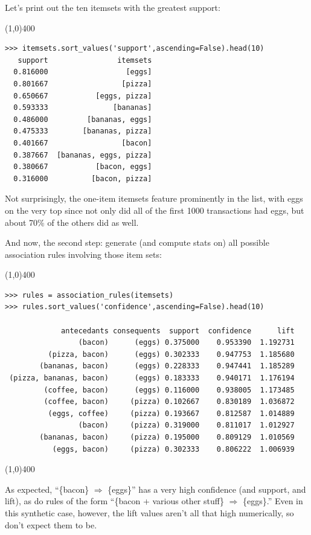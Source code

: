 \documentclass[12pt]{article}
\begin{document}
\vspace{.1in}
Let's print out the ten itemsets with the greatest support:
\footnotesize
\begin{center}
\line(1,0){400}
\end{center}
\begin{Verbatim}[fontsize=\small,samepage=true,frame=none]
>>> itemsets.sort_values('support',ascending=False).head(10)
   support                itemsets
  0.816000                  [eggs]
  0.801667                 [pizza]
  0.650667           [eggs, pizza]
  0.593333               [bananas]
  0.486000         [bananas, eggs]
  0.475333        [bananas, pizza]
  0.401667                 [bacon]
  0.387667  [bananas, eggs, pizza]
  0.380667           [bacon, eggs]
  0.316000          [bacon, pizza]
\end{Verbatim}
\normalsize
\vspace{.3in}
\pagebreak
Not surprisingly, the one-item itemsets feature prominently in the list, with
eggs on the very top since not only did all of the first 1000 transactions had
eggs, but about 70\% of the others did as well.

\vspace{.1in}
And now, the second step: generate (and compute stats on) all possible
association rules involving those item sets:
\begin{center}
\line(1,0){400}
\end{center}
\small
\begin{Verbatim}[fontsize=\small,samepage=true,frame=none]
>>> rules = association_rules(itemsets)
>>> rules.sort_values('confidence',ascending=False).head(10)

             antecedants consequents  support  confidence      lift 
                 (bacon)      (eggs) 0.375000    0.953390  1.192731 
          (pizza, bacon)      (eggs) 0.302333    0.947753  1.185680 
        (bananas, bacon)      (eggs) 0.228333    0.947441  1.185289 
 (pizza, bananas, bacon)      (eggs) 0.183333    0.940171  1.176194 
         (coffee, bacon)      (eggs) 0.116000    0.938005  1.173485 
         (coffee, bacon)     (pizza) 0.102667    0.830189  1.036872 
          (eggs, coffee)     (pizza) 0.193667    0.812587  1.014889 
                 (bacon)     (pizza) 0.319000    0.811017  1.012927 
        (bananas, bacon)     (pizza) 0.195000    0.809129  1.010569 
           (eggs, bacon)     (pizza) 0.302333    0.806222  1.006939 
\end{Verbatim}
\begin{center}
\line(1,0){400}
\end{center}
\normalsize

As expected, ``\{bacon\} $\Rightarrow$ \{eggs\}'' has a very high confidence
(and support, and lift), as do rules of the form ``\{bacon + various other
stuff\} $\Rightarrow$ \{eggs\}.'' Even in this synthetic case, however, the
lift values aren't all that high numerically, so don't expect them to be.
\end{document}

